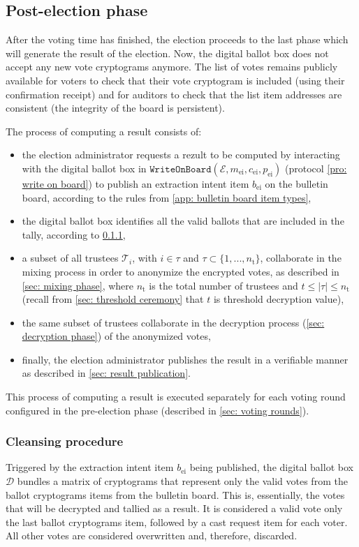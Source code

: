 \subsection{Post-election phase} \label{sec: post-election phase}
After the voting time has finished, the election proceeds to the last phase which will generate the result of the election. Now, the digital ballot box does not accept any new vote cryptograms anymore. The list of votes remains publicly available for voters to check that their vote cryptogram is included (using their confirmation receipt) and for auditors to check that the list item addresses are consistent (the integrity of the board is persistent).

The process of computing a result consists of:
\begin{itemize}
    \item the election administrator requests a rezult to be computed by interacting with the digital ballot box in $\mathtt{WriteOnBoard}(\mathcal{E}, m_\mathrm{ei}, c_\mathrm{ei}, p_\mathrm{ei})$ (protocol \ref{pro: write on board}) to publish an extraction intent item $b_\mathrm{ei}$ on the bulletin board, according to the rules from \cref{app: bulletin board item types},
    \item the digital ballot box identifies all the valid ballots that are included in the tally, according to \cref{sec: cleansing procedure},
    \item a subset of all trustees $\mathcal{T}_i$, with $i \in \tau$ and $\tau \subset \{ 1, ..., n_\mathrm{t} \}$, collaborate in the mixing process in order to anonymize the encrypted votes, as described in \cref{sec: mixing phase}, where $n_\mathrm{t}$ is the total number of trustees and $t \leq |\tau| \leq n_\mathrm{t}$ (recall from \cref{sec: threshold ceremony} that $t$ is threshold decryption value),
    \item the same subset of trustees collaborate in the decryption process (\cref{sec: decryption phase}) of the anonymized votes,
    \item finally, the election administrator publishes the result in a verifiable manner as described in \cref{sec: result publication}.
\end{itemize}

This process of computing a result is executed separately for each voting round configured in the pre-election phase (described in \cref{sec: voting rounds}).


\subsubsection{Cleansing procedure} \label{sec: cleansing procedure}
Triggered by the extraction intent item $b_\mathrm{ei}$ being published, the digital ballot box $\mathcal{D}$ bundles a matrix of cryptograms that represent only the valid votes from the ballot cryptograms items from the bulletin board. This is, essentially, the votes that will be decrypted and tallied as a result. It is considered a valid vote only the last ballot cryptograms item, followed by a cast request item for each voter. All other votes are considered overwritten and, therefore, discarded.

